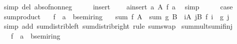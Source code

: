\begin{isabellebody}
\ {\isacharparenleft}{\kern0pt}simp\ del{\isacharcolon}{\kern0pt}\ abs{\isacharunderscore}{\kern0pt}of{\isacharunderscore}{\kern0pt}nonneg{\isacharparenright}{\kern0pt}\isanewline
\ \ \isamarkupfalse%
\ \isamarkupfalse%
\ insert\ \isamarkupfalse%
\ {\isachardoublequoteopen}{\isasymdots}\ {\isacharequal}{\kern0pt}\ {\isacharparenleft}{\kern0pt}{\isasymSum}a{\isasymin}insert\ a\ A{\isachardot}{\kern0pt}\ {\isasymbar}f\ a{\isasymbar}{\isacharparenright}{\kern0pt}{\isachardoublequoteclose}\ \isamarkupfalse%
\ simp\isanewline
\ \ \isamarkupfalse%
\ \isamarkupfalse%
\ {\isacharquery}{\kern0pt}case\ \isacommand{{\isachardot}{\kern0pt}}\isamarkupfalse%
\isanewline
{}\isamarkupfalse%
%
\endisatagproof
{\isafoldproof}%
%
\isadelimproof
\isanewline
%
\endisadelimproof
\isanewline
{}\isamarkupfalse%
\ sum{\isacharunderscore}{\kern0pt}product{\isacharcolon}{\kern0pt}\isanewline
\ \ \ f\ {\isacharcolon}{\kern0pt}{\isacharcolon}{\kern0pt}\ {\isachardoublequoteopen}{\isacharprime}{\kern0pt}a\ {\isasymRightarrow}\ {\isacharprime}{\kern0pt}b{\isacharcolon}{\kern0pt}{\isacharcolon}{\kern0pt}semiring{\isacharunderscore}{\kern0pt}{}{\isachardoublequoteclose}\isanewline
\ \ \ {\isachardoublequoteopen}sum\ f\ A\ {\isacharasterisk}{\kern0pt}\ sum\ g\ B\ {\isacharequal}{\kern0pt}\ {\isacharparenleft}{\kern0pt}{\isasymSum}i{\isasymin}A{\isachardot}{\kern0pt}\ {\isasymSum}j{\isasymin}B{\isachardot}{\kern0pt}\ f\ i\ {\isacharasterisk}{\kern0pt}\ g\ j{\isacharparenright}{\kern0pt}{\isachardoublequoteclose}\isanewline
%
\isadelimproof
\ \ %
\endisadelimproof
%
\isatagproof
{}\isamarkupfalse%
\ {\isacharparenleft}{\kern0pt}simp\ add{\isacharcolon}{\kern0pt}\ sum{\isacharunderscore}{\kern0pt}distrib{\isacharunderscore}{\kern0pt}left\ sum{\isacharunderscore}{\kern0pt}distrib{\isacharunderscore}{\kern0pt}right{\isacharparenright}{\kern0pt}\ {\isacharparenleft}{\kern0pt}rule\ sum{\isachardot}{\kern0pt}swap{\isacharparenright}{\kern0pt}%
\endisatagproof
{\isafoldproof}%
%
\isadelimproof
\isanewline
%
\endisadelimproof
\isanewline
{}\isamarkupfalse%
\ sum{\isacharunderscore}{\kern0pt}mult{\isacharunderscore}{\kern0pt}sum{\isacharunderscore}{\kern0pt}if{\isacharunderscore}{\kern0pt}inj{\isacharcolon}{\kern0pt}\isanewline
\ \ \ f\ {\isacharcolon}{\kern0pt}{\isacharcolon}{\kern0pt}\ {\isachardoublequoteopen}{\isacharprime}{\kern0pt}a\ {\isasymRightarrow}\ {\isacharprime}{\kern0pt}b{\isacharcolon}{\kern0pt}{\isacharcolon}{\kern0pt}semiring{\isacharunderscore}{\kern0pt}{}{\isachardoublequoteclose}\isanewline

\end{isabellebody}
